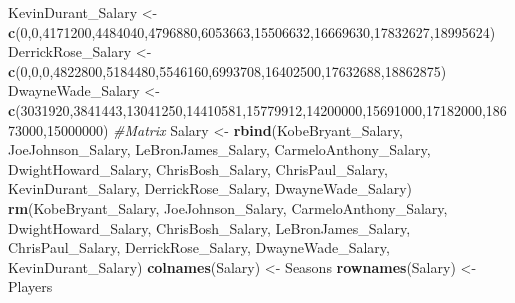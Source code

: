 \documentclass[
]{article}
\newenvironment{Shaded}{\begin{snugshade}}{\end{snugshade}}
\newcommand{\CommentTok}[1]{\textcolor[rgb]{0.56,0.35,0.01}{\textit{#1}}}
\newcommand{\DecValTok}[1]{\textcolor[rgb]{0.00,0.00,0.81}{#1}}
\newcommand{\KeywordTok}[1]{\textcolor[rgb]{0.13,0.29,0.53}{\textbf{#1}}}
\newcommand{\NormalTok}[1]{#1}
\newcommand{\StringTok}[1]{\textcolor[rgb]{0.31,0.60,0.02}{#1}}
\begin{document}
\begin{Shaded}
\begin{Highlighting}[]
\NormalTok{KevinDurant_Salary <-}\StringTok{ }\KeywordTok{c}\NormalTok{(}\DecValTok{0}\NormalTok{,}\DecValTok{0}\NormalTok{,}\DecValTok{4171200}\NormalTok{,}\DecValTok{4484040}\NormalTok{,}\DecValTok{4796880}\NormalTok{,}\DecValTok{6053663}\NormalTok{,}\DecValTok{15506632}\NormalTok{,}\DecValTok{16669630}\NormalTok{,}\DecValTok{17832627}\NormalTok{,}\DecValTok{18995624}\NormalTok{)}
\NormalTok{DerrickRose_Salary <-}\StringTok{ }\KeywordTok{c}\NormalTok{(}\DecValTok{0}\NormalTok{,}\DecValTok{0}\NormalTok{,}\DecValTok{0}\NormalTok{,}\DecValTok{4822800}\NormalTok{,}\DecValTok{5184480}\NormalTok{,}\DecValTok{5546160}\NormalTok{,}\DecValTok{6993708}\NormalTok{,}\DecValTok{16402500}\NormalTok{,}\DecValTok{17632688}\NormalTok{,}\DecValTok{18862875}\NormalTok{)}
\NormalTok{DwayneWade_Salary <-}\StringTok{ }\KeywordTok{c}\NormalTok{(}\DecValTok{3031920}\NormalTok{,}\DecValTok{3841443}\NormalTok{,}\DecValTok{13041250}\NormalTok{,}\DecValTok{14410581}\NormalTok{,}\DecValTok{15779912}\NormalTok{,}\DecValTok{14200000}\NormalTok{,}\DecValTok{15691000}\NormalTok{,}\DecValTok{17182000}\NormalTok{,}\DecValTok{18673000}\NormalTok{,}\DecValTok{15000000}\NormalTok{)}
\CommentTok{#Matrix}
\NormalTok{Salary <-}\StringTok{ }\KeywordTok{rbind}\NormalTok{(KobeBryant_Salary, JoeJohnson_Salary, LeBronJames_Salary, CarmeloAnthony_Salary, DwightHoward_Salary, ChrisBosh_Salary, ChrisPaul_Salary, KevinDurant_Salary, DerrickRose_Salary, DwayneWade_Salary)}
\KeywordTok{rm}\NormalTok{(KobeBryant_Salary, JoeJohnson_Salary, CarmeloAnthony_Salary, DwightHoward_Salary, ChrisBosh_Salary, LeBronJames_Salary, ChrisPaul_Salary, DerrickRose_Salary, DwayneWade_Salary, KevinDurant_Salary)}
\KeywordTok{colnames}\NormalTok{(Salary) <-}\StringTok{ }\NormalTok{Seasons}
\KeywordTok{rownames}\NormalTok{(Salary) <-}\StringTok{ }\NormalTok{Players}


\end{Highlighting}
\end{Shaded}
\end{document}
